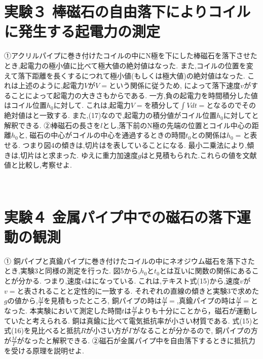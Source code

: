 \documentclass[11pt]{jsarticle}
\begin{document}
\section{実験３ 棒磁石の自由落下によりコイルに発生する起電力の測定}
①アクリルパイプに巻き付けたコイルの中にN極を下にした棒磁石を落下させたとき,起電力の極小値に比べて極大値の絶対値はなった.
また,コイルの位置を変えて落下距離を長くするにつれて極小値(もしくは極大値)の絶対値はなった.
これは上述のように,起電力$V$が$V=$という関係に従うため,
によって落下速度$v$がすることによって起電力の大きさも\fbox{\phantom{ああああああああ}}からである.
一方,負の起電力を時間積分した値はコイル位置$h_0$に対して.
これは,起電力$V=$を積分して$\int V dt=$\fbox{$-\Phi$}となるのでその絶対値はと一致する.
また,(17)なので,起電力の積分値がコイル位置$h_0$に対してと解釈できる.
②棒磁石の長さを$l$とし,落下前のN極の先端の位置とコイル中心の距離$h_0$と,
磁石の中心がコイルの中心を通過するときの時間$t_0$との関係は$h_0=$と表せる.
つまり図4の傾きは,切片はを表していることになる.
最小二乗法により,傾きは,切片はと求まった.
ゆえに重力加速度$g$はと見積もられた.これらの値を文献値と比較し,考察せよ.
\begin{screen}
    \
    \
    \
    \
    \
    \
    \
    \
\end{screen}
\section{実験４ 金属パイプ中での磁石の落下運動の観測}
① 銅パイプと真鍮パイプに巻き付けたコイルの中にネオジウム磁石を落下さたとき,実験3と同様の測定を行った.
図5から,$h_0$と$t_0$とは互いに関数の関係にあることが分かる.
つまり,速度$v$はになっている.
これは,テキスト式(15)から,速度$v$が$v=$と表されることと定性的に一致する.
それぞれの直線の傾きと実験3で求めた$g$の値から,$\frac{M}{\Gamma}$を見積もったところ,
銅パイプの時は$\frac{M}{\Gamma} =$,真鍮パイプの時は$\frac{M}{\Gamma} =$となった.
本実験において測定した時間$t$は$\frac{M}{\Gamma}$よりも十分にことから，磁石が運動していたと考えられる.
銅は真鍮に比べて電気抵抗率が小さい材質である.
式(15)と式(16)を見比べると抵抗$R$が小さい方が$\Gamma$が\fbox{大きく}なることが分かるので,
銅パイプの方が$\frac{M}{\Gamma}$が\fbox{小さく}なったと解釈できる.
②磁石が金属パイプ中を自由落下するときに抵抗力を受ける原理を説明せよ.
\begin{screen}
    \
    \
    \
    \
    \
    \
    \
    \
    \
\end{screen}
\end{document}
